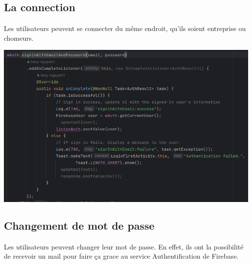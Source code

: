 \documentclass[a4paper]{article}
\begin{document}
\begin{multicols}{2}
        \subsection{La connection}
        \paragraph{}
        Les utilisateurs peuvent se connecter du même endroit, qu'ils soient entreprise ou chomeurs.
        
        \noindent\includegraphics[width=.47\textwidth]{login/signInWithEmailAndPassword}
        \subsection{Changement de mot de passe}
        \paragraph{}
        Les utilisateurs peuvent changer leur mot de passe. En effet, ils ont la possibilité de recevoir un mail pour faire ça grace au service Authentification de Firebase.


\end{multicols}
\end{document}
